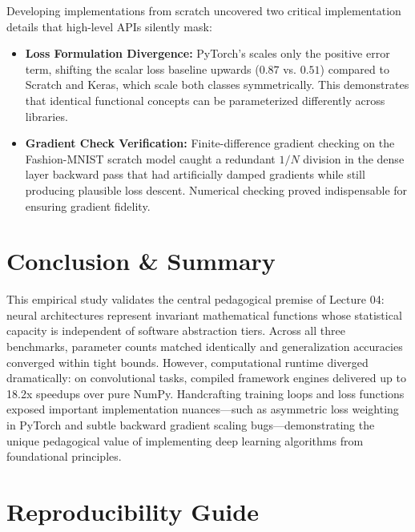 \documentclass[11pt]{article}
\newcommand{\code}[1]{\texttt{\detokenize{#1}}}
\begin{document}
Developing implementations from scratch uncovered two critical implementation details that high-level APIs silently mask:
\begin{itemize}
  \item \textbf{Loss Formulation Divergence:} PyTorch's \code{BCEWithLogitsLoss(pos_weight=...)} scales only the positive error term, shifting the scalar loss baseline upwards ($0.87$ vs. $0.51$) compared to Scratch and Keras, which scale both classes symmetrically. This demonstrates that identical functional concepts can be parameterized differently across libraries.
  \item \textbf{Gradient Check Verification:} Finite-difference gradient checking on the Fashion-MNIST scratch model caught a redundant $1/N$ division in the dense layer backward pass that had artificially damped gradients while still producing plausible loss descent. Numerical checking proved indispensable for ensuring gradient fidelity.
\end{itemize}

\section{Conclusion \& Summary}

This empirical study validates the central pedagogical premise of Lecture 04: neural architectures represent invariant mathematical functions whose statistical capacity is independent of software abstraction tiers. Across all three benchmarks, parameter counts matched identically and generalization accuracies converged within tight bounds. However, computational runtime diverged dramatically: on convolutional tasks, compiled framework engines delivered up to 18.2x speedups over pure NumPy. Handcrafting training loops and loss functions exposed important implementation nuances---such as asymmetric loss weighting in PyTorch and subtle backward gradient scaling bugs---demonstrating the unique pedagogical value of implementing deep learning algorithms from foundational principles.

\section{Reproducibility Guide}
\end{document}
